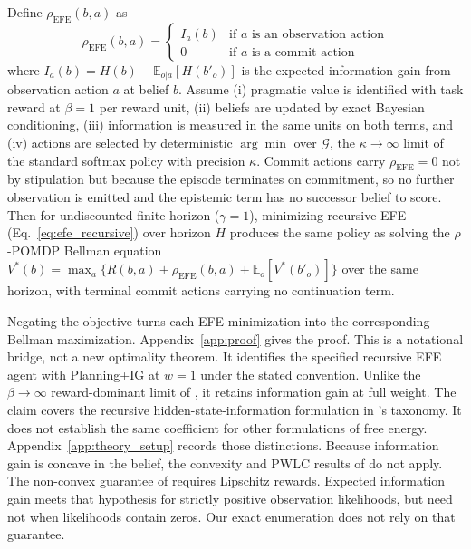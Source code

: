 \begin{proposition}
\label{prop:equivalence}
Define $\rho_{\mathrm{EFE}}(b, a)$ as
\begin{equation*}
    \rho_{\mathrm{EFE}}(b, a) = \begin{cases} I_a(b) & \text{if } a \text{ is an observation action} \\ 0 & \text{if } a \text{ is a commit action} \end{cases}
\end{equation*}
where $I_a(b) = H(b) - \mathbb{E}_{o|a}[H(b'_o)]$ is the expected information gain from observation action $a$ at belief $b$. Assume (i) pragmatic value is identified with task reward at $\beta{=}1$ per reward unit, (ii) beliefs are updated by exact Bayesian conditioning, (iii) information is measured in the same units on both terms, and (iv) actions are selected by deterministic $\arg\min$ over $\mathcal{G}$, the $\kappa \to \infty$ limit of the standard softmax policy with precision $\kappa$. Commit actions carry $\rho_{\mathrm{EFE}}{=}0$ not by stipulation but because the episode terminates on commitment, so no further observation is emitted and the epistemic term has no successor belief to score. Then for undiscounted finite horizon ($\gamma{=}1$), minimizing recursive EFE (Eq.~\ref{eq:efe_recursive}) over horizon $H$ produces the same policy as solving the $\rho$-POMDP Bellman equation $V^*(b) = \max_a \{R(b,a) + \rho_{\mathrm{EFE}}(b,a) + \mathbb{E}_o[V^*(b'_o)]\}$ over the same horizon, with terminal commit actions carrying no continuation term.
\end{proposition}

Negating the objective turns each EFE minimization into the corresponding Bellman maximization. Appendix~\ref{app:proof} gives the proof. This is a notational bridge, not a new optimality theorem. It identifies the specified recursive EFE agent with Planning+IG at $w=1$ under the stated convention. Unlike the $\beta\to\infty$ reward-dominant limit of \citet{dacosta2020b}, it retains information gain at full weight. The claim covers the recursive hidden-state-information formulation in \citet{champion2024}'s taxonomy. It does not establish the same coefficient for other formulations of free energy. Appendix~\ref{app:theory_setup} records those distinctions. Because information gain is concave in the belief, the convexity and PWLC results of \citet{araya2010} do not apply. The non-convex guarantee of \citet{fehr2018} requires Lipschitz rewards. Expected information gain meets that hypothesis for strictly positive observation likelihoods, but need not when likelihoods contain zeros. Our exact enumeration does not rely on that guarantee.

